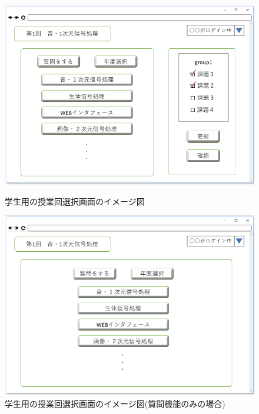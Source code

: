 \begin{figure}[htbp]
 \begin{minipage}{0.5\hsize}
  \begin{center}
   \includegraphics[width=1\linewidth,clip]{./img/32.png}
  \end{center}
  \caption{学生用の授業回選択画面のイメージ図　　　　　　　　　　}\label{fig:32}
 \end{minipage}
 \begin{minipage}{0.5\hsize}
  \begin{center}
   \includegraphics[width=1\linewidth,clip]{./img/33.png}
  \end{center}
  \caption{学生用の授業回選択画面のイメージ図(質問機能のみの場合)}\label{fig:33}
 \end{minipage}
\end{figure}

